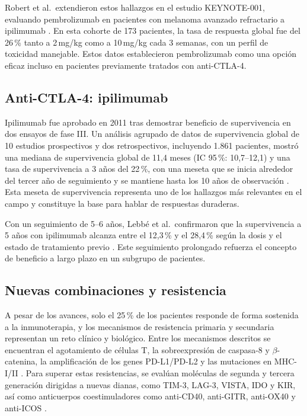 Robert et al.\ extendieron estos hallazgos en el estudio KEYNOTE-001, evaluando pembrolizumab en pacientes con melanoma avanzado refractario a ipilimumab \cite{Robert2014}. En esta cohorte de 173 pacientes, la tasa de respuesta global fue del 26\,\% tanto a 2\,mg/kg como a 10\,mg/kg cada 3 semanas, con un perfil de toxicidad manejable. Estos datos establecieron pembrolizumab como una opción eficaz incluso en pacientes previamente tratados con anti-CTLA-4.

\subsection{Anti-CTLA-4: ipilimumab}

Ipilimumab fue aprobado en 2011 tras demostrar beneficio de supervivencia en dos ensayos de fase III. Un análisis agrupado de datos de supervivencia global de 10 estudios prospectivos y dos retrospectivos, incluyendo 1.861 pacientes, mostró una mediana de supervivencia global de 11,4 meses (IC 95\,\%: 10,7--12,1) y una tasa de supervivencia a 3 años del 22\,\%, con una meseta que se inicia alrededor del tercer año de seguimiento y se mantiene hasta los 10 años de observación \cite{Schadendorf2015}. Esta meseta de supervivencia representa uno de los hallazgos más relevantes en el campo y constituye la base para hablar de respuestas duraderas.

Con un seguimiento de 5--6 años, Lebb\'e et al.\ confirmaron que la supervivencia a 5 años con ipilimumab alcanza entre el 12,3\,\% y el 28,4\,\% según la dosis y el estado de tratamiento previo \cite{Lebbe2014}. Este seguimiento prolongado refuerza el concepto de beneficio a largo plazo en un subgrupo de pacientes.

\subsection{Nuevas combinaciones y resistencia}

A pesar de los avances, solo el 25\,\% de los pacientes responde de forma sostenida a la inmunoterapia, y los mecanismos de resistencia primaria y secundaria representan un reto clínico y biológico. Entre los mecanismos descritos se encuentran el agotamiento de células T, la sobreexpresión de caspasa-8 y $\beta$-catenina, la amplificación de los genes PD-L1/PD-L2 y las mutaciones en MHC-I/II \cite{Dempke2017}. Para superar estas resistencias, se evalúan moléculas de segunda y tercera generación dirigidas a nuevas dianas, como TIM-3, LAG-3, VISTA, IDO y KIR, así como anticuerpos coestimuladores como anti-CD40, anti-GITR, anti-OX40 y anti-ICOS \cite{Dempke2017}.

